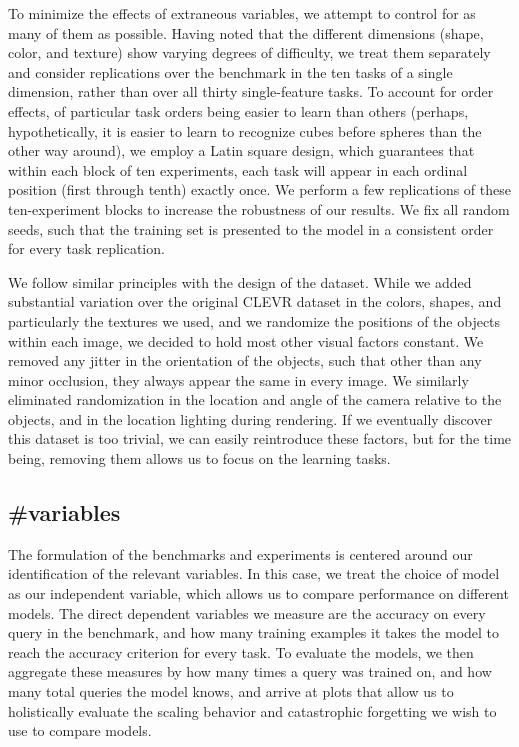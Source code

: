 To minimize the effects of extraneous variables, we attempt to control for as many of them as possible. Having noted that the different dimensions (shape, color, and texture) show varying degrees of difficulty, we treat them separately and consider replications over the benchmark in the ten tasks of a single dimension, rather than over all thirty single-feature tasks. To account for order effects, of particular task orders being easier to learn than others (perhaps, hypothetically, it is easier to learn to recognize cubes before spheres than the other way around), we employ a Latin square design, which guarantees that within each block of ten experiments, each task will appear in each ordinal position (first through tenth) exactly once. We perform a few replications of these ten-experiment blocks to increase the robustness of our results. We fix all random seeds, such that the training set is presented to the model in a consistent order for every task replication.

We follow similar principles with the design of the dataset. While we added substantial variation over the original CLEVR dataset in the colors, shapes, and particularly the textures we used, and we randomize the positions of the objects within each image, we decided to hold most other visual factors constant. We removed any jitter in the orientation of the objects, such that other than any minor occlusion, they always appear the same in every image. We similarly eliminated randomization in the location and angle of the camera relative to the objects, and in the location lighting during rendering. If we eventually discover this dataset is too trivial, we can easily reintroduce these factors, but for the time being, removing them allows us to focus on the learning tasks. 

\subsection{\#variables}
The formulation of the benchmarks and experiments is centered around our identification of the relevant variables. In this case, we treat the choice of model as our independent variable, which allows us to compare performance on different models. The direct dependent variables we measure are the accuracy on every query in the benchmark, and how many training examples it takes the model to reach the accuracy criterion for every task. To evaluate the models, we then aggregate these measures by how many times a query was trained on, and how many total queries the model knows, and arrive at plots that allow us to holistically evaluate the scaling behavior and catastrophic forgetting we wish to use to compare models.

